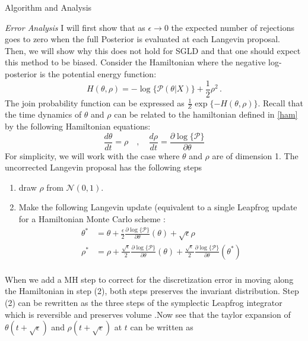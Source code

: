 \documentclass{article}
\begin{document}
\begin{section}{Algorithm and Analysis}
\begin{subsection}{\it Error Analysis}
I will first show that as $\epsilon \to 0$ the expected number of rejections goes to zero when the full Posterior is evaluated at each Langevin proposal.  Then, we will show why this does not hold for SGLD and that one should expect this method to be biased.  Consider the Hamiltonian where the negative log-posterior is the potential energy function:
\begin{equation} 
H(\theta,\rho) = -\log\{\mathcal{P}(\theta|X)\} + \frac{1}{2}\rho^2 \,. \label{ham}
\end{equation}
The join probability function can be expressed as $\frac{1}{Z}\exp\{ -H(\theta,\rho) \}$. Recall that the time dynamics of $\theta$ and $\rho$ can be related to the hamiltonian defined in \eqref{ham} by the following Hamiltonian equations:
\begin{equation}
\frac{d \theta}{dt}  = \rho\quad, \quad \frac{d \rho}{dt}  = \frac{\partial \log\{\mathcal{P}\}}{\partial \theta} \label{dHam}
\end{equation}
For simplicity, we will work with the case where $\theta$ and $\rho$ are of dimension 1.  The uncorrected Langevin proposal has the following steps
\begin{enumerate}
\item draw $\rho$ from $\mathcal{N}(0,1)$.
\item Make the following Langevin update (equivalent to a single Leapfrog update for a Hamiltonian Monte Carlo scheme \cite{Neal10}:
\begin{align}
\theta^*&  = \theta + \frac{\epsilon}{2} \frac{\partial  \log\{\mathcal{P}\}}{\partial \theta}(\theta) + \sqrt{\epsilon} \rho \label{dLt}\\
\rho^*&  = \rho+ \frac{\sqrt{\epsilon}}{2} \frac{\partial  \log\{\mathcal{P}\}}{\partial \theta}(\theta) + \frac{\sqrt{\epsilon}}{2} \frac{\partial \log\{\mathcal{P}\}}{\partial \theta}(\theta^*)  \label{dLp} \\
\end{align}
\end{enumerate}
When we add a MH step to correct for the discretization error in moving along the Hamiltonian in step (2), both steps preserves the invariant distribution.  Step (2) can be rewritten as the three steps of the symplectic Leapfrog integrator which is reversible and preserves volume \cite{Neal10}.Now see that the taylor expansion of $\theta(t+\sqrt{\epsilon})$ and $\rho(t+\sqrt{\epsilon})$ at $t$ can be written as
\begin{align}

\end{align}
\end{subsection}
\end{section}
\end{document}
